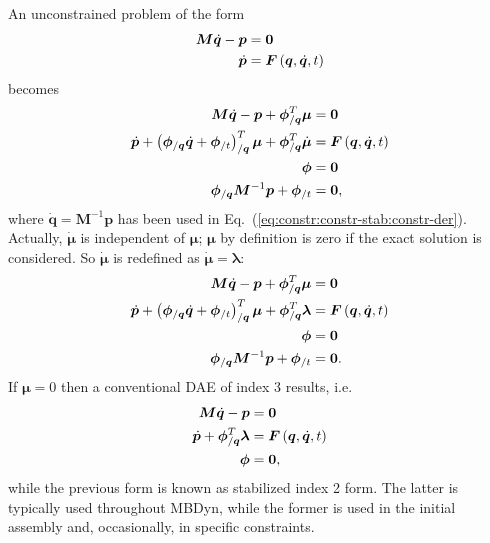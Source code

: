 \documentclass[10pt,dvips,fleqn,subeqn]{report}
\newcommand{\T}[1]{\bm{#1}}
\newcommand{\TT}[1]{\bm{#1}}
\begin{document}
An unconstrained problem of the form
\begin{subequations}
\begin{align}
	\T{M} \dot{\T{q}} - \T{p} &= \T{0} \\
	\dot{\T{p}} &= \T{F}\plbr{\T{q}, \dot{\T{q}}, t}
\end{align}
\end{subequations}
becomes
\begin{subequations}
\begin{align}
	\T{M} \dot{\T{q}} - \T{p} + \T{\phi}_{/\T{q}}^T \T{\mu} &= \T{0} \\
	\dot{\T{p}} + \plbr{
		\T{\phi}_{/\T{q}} \dot{\T{q}}
		+ \T{\phi}_{/t}
	}_{/\T{q}}^T \T{\mu}
	+ \T{\phi}_{/\T{q}}^T \dot{\T{\mu}} &= \T{F}\plbr{\T{q}, \dot{\T{q}}, t} \\
	\T{\phi} &= \T{0} \\
	\T{\phi}_{/\T{q}} \TT{M}^{-1} \T{p} + \T{\phi}_{/t} &= \T{0} \label{eq:constr:constr-stab:constr-der},
\end{align}
\end{subequations}
where $\dot{\T{q}}=\TT{M}^{-1}\T{p}$ has been used
in Eq.~(\ref{eq:constr:constr-stab:constr-der}).
Actually, $\dot{\T{\mu}}$ is independent of $\T{\mu}$;
$\T{\mu}$ by definition is zero if the exact solution is considered.
So $\dot{\T{\mu}}$ is redefined as $\dot{\T{\mu}}=\T{\lambda}$:
\begin{subequations}
\begin{align}
	\T{M} \dot{\T{q}} - \T{p} + \T{\phi}_{/\T{q}}^T \T{\mu} &= \T{0} \\
	\dot{\T{p}} + \plbr{
		\T{\phi}_{/\T{q}} \dot{\T{q}}
		+ \T{\phi}_{/t}
	}_{/\T{q}}^T \T{\mu} + \T{\phi}_{/\T{q}}^T \T{\lambda}
		&= \T{F}\plbr{\T{q}, \dot{\T{q}}, t} \\
	\T{\phi} &= \T{0} \\
	\T{\phi}_{/\T{q}} \TT{M}^{-1} \T{p} + \T{\phi}_{/t} &= \T{0} .
\end{align}
\end{subequations}
If $\T{\mu}=0$ then a conventional DAE of index 3 results, i.e.
\begin{subequations}
\begin{align}
	\T{M} \dot{\T{q}} - \T{p} &= \T{0} \\
	\dot{\T{p}} + \T{\phi}_{/\T{q}}^T \T{\lambda}
		&= \T{F}\plbr{\T{q}, \dot{\T{q}}, t} \\
	\T{\phi} &= \T{0} ,
\end{align}
\end{subequations}
while the previous form is known as stabilized index 2 form.
The latter is typically used throughout MBDyn, while the former is used 
in the initial assembly and, occasionally, in specific constraints.
\end{document}
